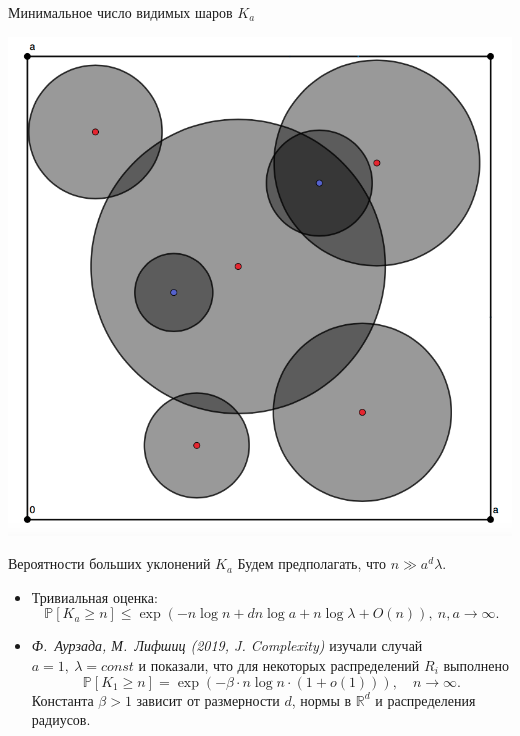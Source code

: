 \documentclass[aspectratio=1610]{beamer}
\theoremstyle{plain}
\theoremstyle{definition}
\theoremstyle{remark}
\def\geq{\geqslant}
\def\leq{\leqslant}
\newcommand{\cuplim}{\bigcup\limits}
\newcommand{\R}{\mathbb{R}}
\newcommand{\PP}{\mathbb{P}}
\begin{document}
\begin{frame}{Минимальное число видимых шаров $K_a$}
\begin{center}
  \includegraphics[scale = 0.5]{pic1.png}  
\end{center}




\end{frame}{}

\begin{frame}{Вероятности больших уклонений $K_a$} 
Будем предполагать, что $n\gg a^d\lambda$.

\begin{itemize}
    \item Тривиальная оценка:
$$ \PP[K_a \geq n] \leq 
    \exp(-n\log n + dn\log a + n\log\lambda + 
    O(n)), \ n, a\to \infty.$$
    
    \item {\it Ф.~Аурзада, М.~Лифшиц (2019, J. Complexity)} изучали случай $a=1,\ \lambda = const$ и показали, что для некоторых распределений $R_i$ выполнено 
$$\PP[K_1 \geq n] = \exp(-\beta\cdot n\log n\cdot (1 + o(1))), \quad n\to\infty.$$
Константа $\beta > 1$ зависит от размерности $d$, нормы в $\R^d$ и распределения радиусов.
\end{itemize}

\end{frame}
\end{document}
